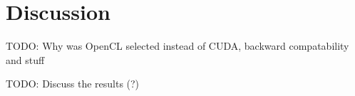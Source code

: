 \chapter{Discussion}
\label{chap:discussion}

TODO: Why was OpenCL selected instead of CUDA, backward compatability and stuff

TODO: Discuss the results (?)
